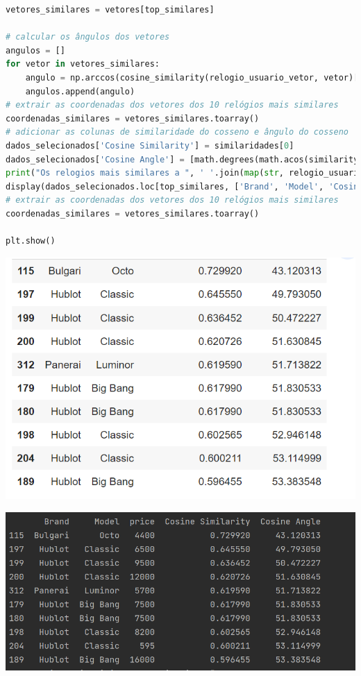 \documentclass[12pt, a4paper]{article}
\begin{document}
\begin{tcolorbox}[colback=blue!20, colframe=gray!20]
\begin{lstlisting}[language=Python]
vetores_similares = vetores[top_similares]

# calcular os ângulos dos vetores
angulos = []
for vetor in vetores_similares:
    angulo = np.arccos(cosine_similarity(relogio_usuario_vetor, vetor)[0][0]) * 180 / np.pi
    angulos.append(angulo)
# extrair as coordenadas dos vetores dos 10 relógios mais similares
coordenadas_similares = vetores_similares.toarray()
# adicionar as colunas de similaridade do cosseno e ângulo do cosseno
dados_selecionados['Cosine Similarity'] = similaridades[0]
dados_selecionados['Cosine Angle'] = [math.degrees(math.acos(similarity)) for similarity in similaridades[0]]
print("Os relogios mais similares a ", ' '.join(map(str, relogio_usuario)), "são:")
display(dados_selecionados.loc[top_similares, ['Brand', 'Model', 'Cosine Similarity', 'Cosine Angle']])
# extrair as coordenadas dos vetores dos 10 relógios mais similares
coordenadas_similares = vetores_similares.toarray()

plt.show()
\end{lstlisting}
\end{tcolorbox}
\begin{center}
    \includegraphics[width=14cm]{fig4.png}
\end{center}
\begin{center}
    \includegraphics[width=14cm]{fig5.png}
\end{center}
\end{document}

